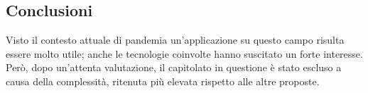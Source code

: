 \subsection{Conclusioni}
Visto il contesto attuale di pandemia un'applicazione su questo campo risulta essere molto utile; anche le tecnologie coinvolte hanno suscitato un forte interesse. Però, dopo un'attenta valutazione, il capitolato in questione è stato escluso a causa della complessità, ritenuta più elevata rispetto alle altre proposte. 
